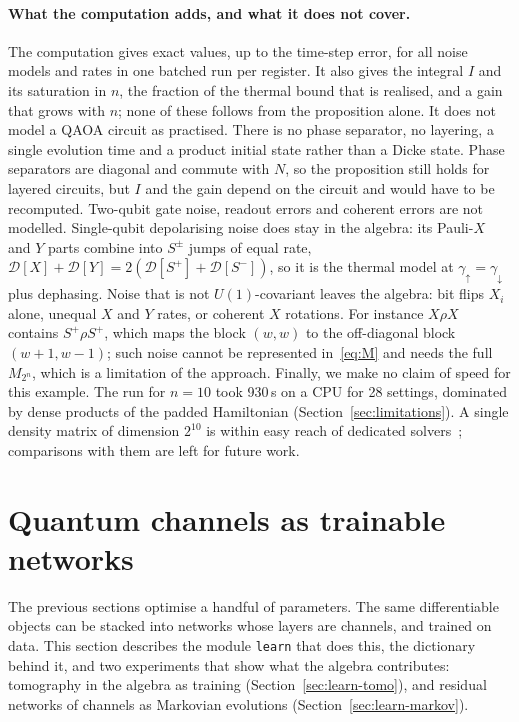 \documentclass[11pt]{article}
\begin{document}
\paragraph{What the computation adds, and what it does not cover.} The computation gives exact values, up to the
time-step error, for all noise models and rates in one batched run per register. It also gives the integral $I$ and its
saturation in $n$, the fraction of the thermal bound that is realised, and a gain that grows with $n$; none of these
follows from the proposition alone. It does not model a QAOA circuit as practised. There is no phase separator, no
layering, a single evolution time and a product initial state rather than a Dicke state. Phase separators are diagonal
and commute with $N$, so the proposition still holds for layered circuits, but $I$ and the gain depend on the circuit
and would have to be recomputed. Two-qubit gate noise, readout errors and coherent errors are not modelled.
Single-qubit depolarising noise does stay in the algebra: its Pauli-$X$ and $Y$ parts combine into $S^\pm$ jumps of equal
rate, $\mathcal D[X]+\mathcal D[Y]=2(\mathcal D[S^+]+\mathcal D[S^-])$, so it is the thermal model at
$\gamma_\uparrow=\gamma_\downarrow$ plus dephasing. Noise that is not $U(1)$-covariant leaves the algebra: bit flips
$X_i$ alone, unequal $X$ and $Y$ rates, or coherent $X$ rotations. For instance $X\rho X$ contains $S^+\rho S^+$, which
maps the block $(w,w)$ to the off-diagonal block $(w+1,w-1)$; such noise cannot be represented in~\eqref{eq:M} and
needs the full $M_{2^n}$, which is a limitation of the approach. Finally, we make no claim of speed for this example.
The run for $n=10$ took 930\,s on a CPU for 28 settings, dominated by dense products of the padded Hamiltonian
(Section~\ref{sec:limitations}). A single density matrix of dimension $2^{10}$ is within easy reach of dedicated
solvers~\cite{lambert2026,mercurio2025,dynamiqs}; comparisons with them are left for future work.



\section{Quantum channels as trainable networks}\label{sec:learn}

The previous sections optimise a handful of parameters. The same differentiable objects can be stacked into networks
whose layers are channels, and trained on data. This section describes the module \texttt{learn} that does this, the
dictionary behind it, and two experiments that show what the algebra contributes: tomography in the algebra as
training (Section~\ref{sec:learn-tomo}), and residual networks of channels as Markovian evolutions
(Section~\ref{sec:learn-markov}).
\end{document}
